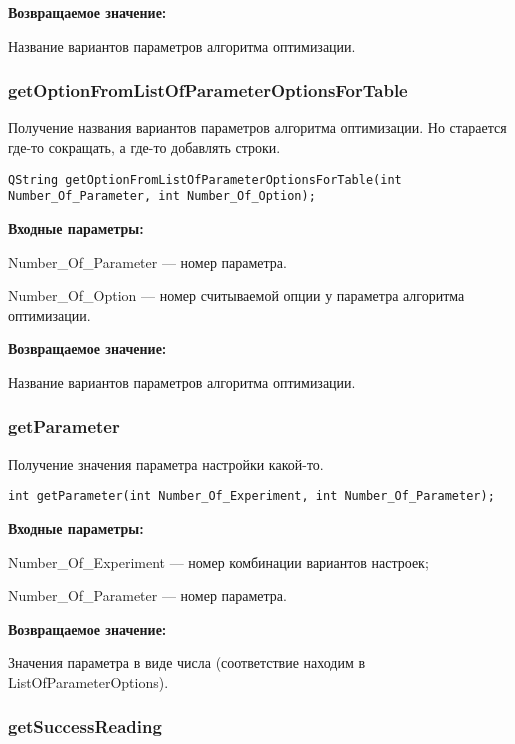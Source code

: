 \documentclass[a4paper,12pt]{article}
\begin{document}
\textbf{Возвращаемое значение:}

Название вариантов параметров алгоритма оптимизации.


\subsubsection{getOptionFromListOfParameterOptionsForTable}\label{getOptionFromListOfParameterOptionsForTable}

Получение названия вариантов параметров алгоритма оптимизации. Но старается где-то сокращать, а где-то добавлять строки.


\begin{lstlisting}[label=code_syntax_getOptionFromListOfParameterOptionsForTable,caption=Синтаксис]
QString getOptionFromListOfParameterOptionsForTable(int Number_Of_Parameter, int Number_Of_Option);
\end{lstlisting}

\textbf{Входные параметры:}

Number\_Of\_Parameter --- номер параметра.

Number\_Of\_Option --- номер считываемой опции у параметра алгоритма оптимизации.

\textbf{Возвращаемое значение:}

Название вариантов параметров алгоритма оптимизации.


\subsubsection{getParameter}\label{getParameter}

Получение значения параметра настройки какой-то.


\begin{lstlisting}[label=code_syntax_getParameter,caption=Синтаксис]
int getParameter(int Number_Of_Experiment, int Number_Of_Parameter);
\end{lstlisting}

\textbf{Входные параметры:}

Number\_Of\_Experiment --- номер комбинации вариантов настроек;

Number\_Of\_Parameter --- номер параметра.

\textbf{Возвращаемое значение:}

Значения параметра в виде числа (соответствие находим в ListOfParameterOptions).


\subsubsection{getSuccessReading}\label{getSuccessReading}
\end{document}
